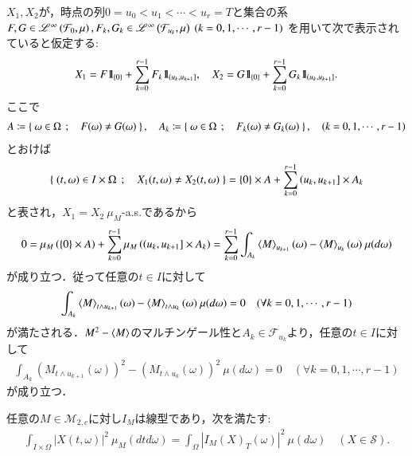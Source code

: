 	\begin{prf}
		$X_1,X_2$が，時点の列$0=u_0<u_1<\cdots<u_r = T$と集合の系$F,G \in \semiLp{\infty}{\mathcal{F}_0,\mu},
		F_k,G_k \in \semiLp{\infty}{\mathcal{F}_{u_k},\mu}\ (k=0,1,\cdots,r-1)$
		を用いて次で表示されていると仮定する:
		\begin{align}
			X_1 = F \mbox{1}\hspace{-0.25em}\mbox{l}_{\{0\}} + \sum_{k=0}^{r-1} F_k \mbox{1}\hspace{-0.25em}\mbox{l}_{\left(u_k,u_{k+1}\right]},
			\quad X_2 = G \mbox{1}\hspace{-0.25em}\mbox{l}_{\{0\}} + \sum_{k=0}^{r-1} G_k \mbox{1}\hspace{-0.25em}\mbox{l}_{\left(u_k,u_{k+1}\right]}.
		\end{align}
		ここで
		\begin{align}
			A \coloneqq \left\{\ \omega \in \Omega\ \, ; \quad F(\omega) \neq G(\omega)\ \right\},
			\quad A_k \coloneqq \left\{\ \omega \in \Omega\ \, ; \quad F_k(\omega) \neq G_k(\omega)\ \right\},
			\quad (k=0,1,\cdots,r-1)
		\end{align}
		とおけば
		\begin{align}
			\left\{\ (t,\omega) \in I \times \Omega\ \, ; \quad X_1(t,\omega) \neq X_2(t,\omega)\ \right\}
			= \{0\} \times A + \sum_{k=0}^{r-1} \left( u_k,u_{k+1} \right] \times A_k
		\end{align}
		と表され，$X_1 = X_2\ \mu_M$-a.s.であるから
		\begin{align}
			0 = \mu_M\left( \{0\} \times A \right) + \sum_{k=0}^{r-1} \mu_M\left( \left( u_k,u_{k+1} \right] \times A_k \right)
			= \sum_{k=0}^{r-1} \int_{A_k} \inprod<M>_{u_{k+1}}(\omega) - \inprod<M>_{u_k}(\omega)\ \mu(d\omega)
		\end{align}
		が成り立つ．従って任意の$t \in I$に対して
		\begin{align}
			\int_{A_k} \inprod<M>_{t \wedge u_{k+1}}(\omega) - \inprod<M>_{t \wedge u_k}(\omega)\ \mu(d\omega) = 0
			\quad (\forall k=0,1,\cdots,r-1)
		\end{align}
		が満たされる．$M^2 - \inprod<M>$のマルチンゲール性と$A_k \in \mathcal{F}_{u_k}$より，任意の$t \in I$に対して
		\begin{align}
			\int_{A_k} \left( M_{t \wedge u_{k+1}}(\omega) \right)^2 - \left( M_{t \wedge u_k}(\omega) \right)^2\ \mu(d\omega) = 0
			\quad (\forall k=0,1,\cdots,r-1)
		\end{align}
		が成り立つ．
	\end{prf}
	
	\begin{screen}
		\begin{thm}[伊藤積分の線型等長性]
			任意の$M \in \mathcal{M}_{2,c}$に対し$I_M$は線型であり，次を満たす:
			\begin{align}
				\int_{I \times \Omega} \left| X(t,\omega) \right|^2\ \mu_M(dtd\omega)
				= \int_\Omega \left| I_M(X)_T(\omega) \right|^2\ \mu(d\omega)
				\quad (X \in \mathcal{S}).
				\label{eq:thm_Ito_integral_linearity_isometric}
			\end{align}
			\label{thm:Ito_integral_linearity_isometric}
		\end{thm}
	\end{screen}
	
